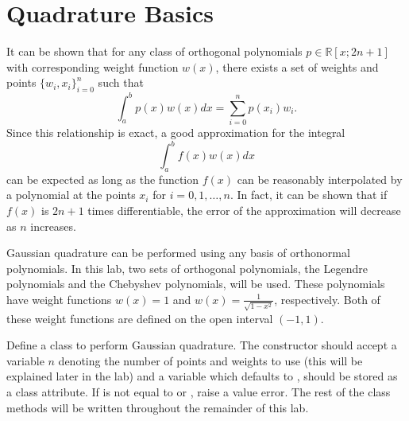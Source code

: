 \label{Lab:GaussQuad}



\section*{Quadrature Basics}

It can be shown that for any class of orthogonal polynomials $p\in \mathbb{R}[x;2n+1]$ with corresponding weight function $w(x)$, there exists a set of weights and points $\{ w_i, x_i \}_{i=0}^n$ such that
\[
\int_a^b p(x) w(x) dx = \sum_{i=0}^n p(x_i)w_i.
\]
Since this relationship is exact, a good approximation for the integral
\[
\int_a^b f(x) w(x) dx
\]
can be expected as long as the function $f(x)$ can be reasonably interpolated by a polynomial at the points $x_i$ for $i=0,1,\dots,n$.
In fact, it can be shown that if $f(x)$ is $2n+1$ times differentiable, the error of the approximation will decrease as $n$ increases.

Gaussian quadrature can be performed using any basis of orthonormal polynomials.
In this lab, two sets of orthogonal polynomials, the Legendre polynomials and the Chebyshev polynomials, will be used.
These polynomials have weight functions $w(x)=1$ and $w(x)=\frac{1}{\sqrt{1-x^2}}$, respectively.
Both of these weight functions are defined on the open interval $(-1,1)$.
\begin{problem}
Define a class to perform Gaussian quadrature.
The constructor should accept a variable $n$ denoting the number of points and weights to use (this will be explained later in the lab) and a variable  which defaults to , 
 should be stored as a class attribute.
If  is not equal to  or , raise a value error.
The rest of the class methods will be written throughout the remainder of this lab.
\end{problem}


